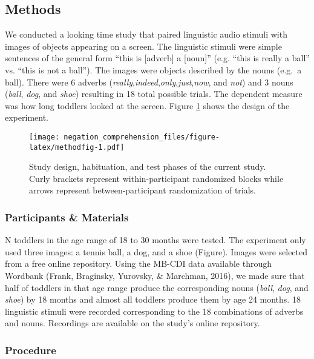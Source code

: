 \documentclass[man,floatsintext]{apa6}
\begin{document}
\hypertarget{methods}{%
\subsection{Methods}\label{methods}}

We conducted a looking time study that paired linguistic audio stimuli with images of objects appearing on a screen. The linguistic stimuli were simple sentences of the general form \enquote{this is {[}adverb{]} a {[}noun{]}} (e.g. \enquote{this is really a ball} vs. \enquote{this is not a ball}). The images were objects described by the nouns (e.g.~a ball). There were 6 adverbs (\emph{really},\emph{indeed},\emph{only},\emph{just},\emph{now}, and \emph{not}) and 3 nouns (\emph{ball}, \emph{dog}, and \emph{shoe}) resulting in 18 total possible trials. The dependent measure was how long toddlers looked at the screen. Figure \ref{fig:methodfig} shows the design of the experiment.

\begin{figure}
\centering
\texttt{[image: negation\_comprehension\_files/figure-latex/methodfig-1.pdf]}
\caption{\label{fig:methodfig}Study design, habituation, and test phases of the current study. Curly brackets represent within-participant randomized blocks while arrows represent between-participant randomization of trials.}
\end{figure}

\hypertarget{participants-materials}{%
\subsubsection{Participants \& Materials}\label{participants-materials}}

N toddlers in the age range of 18 to 30 months were tested. The experiment only used three images: a tennis ball, a dog, and a shoe (Figure). Images were selected from a free online repository. Using the MB-CDI data available through Wordbank (Frank, Braginsky, Yurovsky, \& Marchman, 2016), we made sure that half of toddlers in that age range produce the corresponding nouns (\emph{ball}, \emph{dog}, and \emph{shoe}) by 18 months and almost all toddlers produce them by age 24 months. 18 linguistic stimuli were recorded corresponding to the 18 combinations of adverbs and nouns. Recordings are available on the study's online repository.

\hypertarget{procedure}{%
\subsubsection{Procedure}\label{procedure}}
\end{document}
